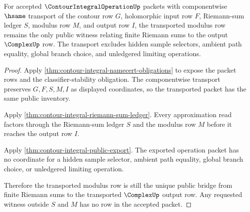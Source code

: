 \begin{theorem}
\label{thm:contour-integral-operation-modulus-transport}
For accepted $\ContourIntegralOperationUp$ packets with componentwise $\hsame$ transport of the contour row $G$, holomorphic input row $F$, Riemann-sum ledger $S$, modulus row $M$, and output row $I$, the transported modulus row remains the only public witness relating finite Riemann sums to the output $\ComplexUp$ row. The transport excludes hidden sample selectors, ambient path equality, global branch choice, and unledgered limiting operations.
\end{theorem}
\begin{proof}
Apply \autoref{thm:contour-integral-namecert-obligations} to expose the packet rows and the classifier-stability obligation. The componentwise transport preserves $G,F,S,M,I$ as displayed coordinates, so the transported packet has the same public inventory.

Apply \autoref{thm:contour-integral-riemann-sum-ledger}. Every approximation read factors through the Riemann-sum ledger $S$ and the modulus row $M$ before it reaches the output row $I$.

Apply \autoref{thm:contour-integral-public-export}. The exported operation packet has no coordinate for a hidden sample selector, ambient path equality, global branch choice, or unledgered limiting operation.

Therefore the transported modulus row is still the unique public bridge from finite Riemann sums to the transported $\ComplexUp$ output row. Any requested witness outside $S$ and $M$ has no row in the accepted packet.
\end{proof}

